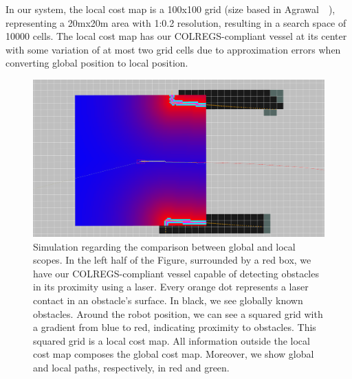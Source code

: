         In our system, the local cost map is a 100x100 grid (size based in Agrawal~\etal{}~\cite{Agrawal2015COLREGS}), representing a 20mx20m area with 1:0.2 resolution, resulting in a search space of 10000 cells. The local cost map has our \ac{COLREGS}-compliant vessel at its center with some variation of at most two grid cells due to approximation errors when converting global position to local position.
        
         \begin{figure}[H]
            \centering
            \includegraphics[scale=0.35]{figs/Chap4/reduced_localCostMap2.png}
            \caption{Simulation regarding the comparison between global and local scopes. In the left half of the Figure, surrounded by a red box, we have our \ac{COLREGS}-compliant vessel capable of detecting obstacles in its proximity using a laser. Every orange dot represents a laser contact in an obstacle's surface. In black, we see globally known obstacles.  Around the robot position, we can see a squared grid with a gradient from blue to red, indicating proximity to obstacles. This squared grid is a local cost map. All information outside the local cost map composes the global cost map. Moreover, we show global and local paths, respectively, in red and green.}
            \label{fig:costmaps}
        \end{figure}


